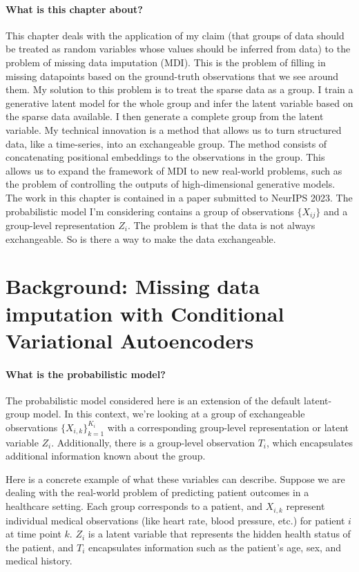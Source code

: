 \documentclass[backrefs]{cam-thesis}
\begin{document}
\paragraph{What is this chapter about?} This chapter deals with the application of my claim (that groups of data should be treated as random variables whose values should be inferred from data) to the problem of missing data imputation (MDI). This is the problem of filling in missing datapoints based on the ground-truth observations that we see around them. My solution to this problem is to treat the sparse data as a group. I train a generative latent model for the whole group and infer the latent variable based on the sparse data available. I then generate a complete group from the latent variable. My technical innovation is a method that allows us to turn structured data, like a time-series, into an exchangeable group. The method consists of concatenating positional embeddings to the observations in the group. This allows us to expand the framework of MDI to new real-world problems, such as the problem of controlling the outputs of high-dimensional generative models. The work in this chapter is contained in a paper submitted to NeurIPS 2023. The probabilistic model I'm considering contains a group of observations $\{X_{ij}\}$ and a group-level representation $Z_i$. The problem is that the data is not always exchangeable. So is there a way to make the data exchangeable.

\section{Background: Missing data imputation with Conditional Variational Autoencoders}

\paragraph{What is the probabilistic model?} The probabilistic model considered here is an extension of the default latent-group model. In this context, we're looking at a group of exchangeable observations $\{X_{i,k}\}_{k=1}^{K_i}$ with a corresponding group-level representation or latent variable $Z_i$. Additionally, there is a group-level observation $T_i$, which encapsulates additional information known about the group. 

Here is a concrete example of what these variables can describe. Suppose we are dealing with the real-world problem of predicting patient outcomes in a healthcare setting. Each group corresponds to a patient, and $X_{i,k}$ represent individual medical observations (like heart rate, blood pressure, etc.) for patient $i$ at time point $k$. $Z_i$ is a latent variable that represents the hidden health status of the patient, and $T_i$ encapsulates information such as the patient's age, sex, and medical history.
\end{document}
